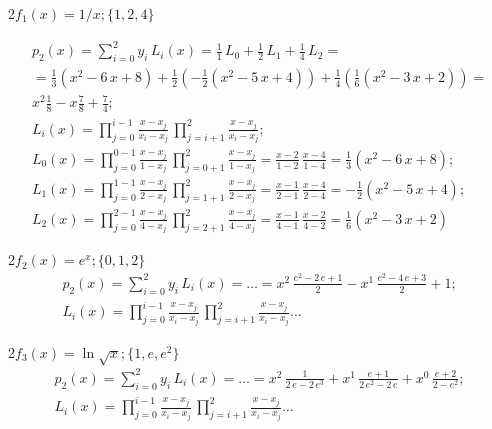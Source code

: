 \documentclass["CN_A-Exercises_Resolutions.tex"]{subfiles}
\begin{document}
\begin{questionBox}2{\(f_1(x)=1/x;\{1,2,4\}\)} %
  \answer{}

  \begin{gather*}
    p_{2}(x)
    = \sum_{i=0}^{2}{ y_i\,L_{i}(x) }
    = \frac{1}{1}\,L_0
    + \frac{1}{2}\,L_1
    + \frac{1}{4}\,L_2
    = \\ 
    = 
    \frac{1}{3} ( x^2 -6\,x +8 )
    + \frac{1}{2}\left(-\frac{1}{2} ( x^2 -5\,x +4 )\right)
    + \frac{1}{4} \left( \frac{1}{6} ( x^2 -3\,x +2 )\right)
    = \\
    x^2\frac{ 1 }{ 8 }
    - x\frac{ 7 }{ 8 }
    + \frac{ 7 }{ 4 }
    ;\\[1ex]
    L_i(x)
    =\prod_{j=0}^{i-1}{\frac{x-x_j}{x_i-x_j}}
    \,\prod_{j=i+1}^{2}{\frac{x-x_j}{x_i-x_j}}
    ;\\[1ex]
    L_0(x)
    =\prod_{j=0}^{0-1}{\frac{x-x_j}{1-x_j}}
    \,\prod_{j=0+1}^{2}{\frac{x-x_j}{1-x_j}}
    = \frac{x-2}{1-2}
    \,\frac{x-4}{1-4}
    = \frac{1}{3} ( x^2 -6\,x +8 )
    ;\\[1ex]
    L_1(x)
    =\prod_{j=0}^{1-1}{\frac{x-x_j}{2-x_j}}
    \,\prod_{j=1+1}^{2}{\frac{x-x_j}{2-x_j}}
    = \frac{x-1}{2-1}
    \,\frac{x-4}{2-4}
    = -\frac{1}{2} ( x^2 -5\,x +4 )
    ;\\[1ex]
    L_2(x)
    =\prod_{j=0}^{2-1}{\frac{x-x_j}{4-x_j}}
    \,\prod_{j=2+1}^{2}{\frac{x-x_j}{4-x_j}}
    = \frac{x-1}{4-1}
    \,\frac{x-2}{4-2}
    = \frac{1}{6} ( x^2 -3\,x +2 )
  \end{gather*}
\end{questionBox}

\begin{questionBox}2{\(f_2(x)=e^x;\{0,1,2\}\)} %
  \answer{}
  \begin{gather*}
    p_{2}(x)
    = \sum_{i=0}^{2}{ y_i\,L_{i}(x) }
    =\dots
    = x^2\,\frac{e^2-2\,e+1}{2}
    - x^1\,\frac{e^2-4\,e+3}{2}
    + 1
    ;\\
    L_{i}(x)
    =\prod_{j=0}^{i-1}{\frac{x-x_j}{x_i-x_j}}
    \,\prod_{j=i+1}^{2}{\frac{x-x_j}{x_i-x_j}}
    \dots
  \end{gather*}
\end{questionBox}

\begin{questionBox}2{\(f_3(x)=\ln\sqrt{x};\{1,e,e^2\}\)} %
  \answer{}
  \begin{gather*}
    p_{2}(x)
    = \sum_{i=0}^{2}{ y_i\,L_{i}(x) }
    = \dots
    = x^2\,\frac{1}{2\,e-2\,e^3}
    + x^1\,\frac{e+1}{2\,e^2-2\,e}
    + x^0\,\frac{e+2}{2-e^2}
    ;\\
    L_{i}(x)
    =\prod_{j=0}^{i-1}{\frac{x-x_j}{x_i-x_j}}
    \,\prod_{j=i+1}^{2}{\frac{x-x_j}{x_i-x_j}}
    \dots
  \end{gather*}
\end{questionBox}
\end{document}
